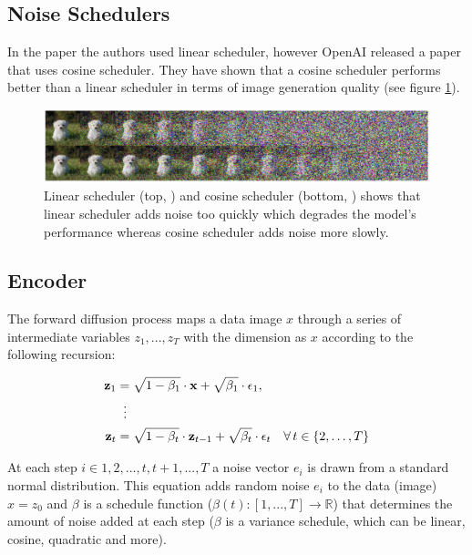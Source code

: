 \subsection{Noise Schedulers}

In the paper \cite{ddpm} the authors used linear scheduler, however OpenAI released a paper \cite{openai_improved_ddpm} that uses cosine scheduler. They have shown that a cosine scheduler performs better than a linear scheduler in terms of image generation quality (see figure \ref{fig:linear_cosine_scheduler}).

\begin{figure}
    \centering
    \includegraphics[width=1\textwidth]{images/diffusion_models/linear_cosine_scheduler.png}
    \caption{Linear scheduler (top, \cite{ddpm}) and cosine scheduler (bottom, \cite{openai_improved_ddpm}) shows that linear scheduler adds noise too quickly which degrades the model's performance whereas cosine scheduler adds noise more slowly.}
    \label{fig:linear_cosine_scheduler}
\end{figure}







\subsection{Encoder}

The forward diffusion process maps a data image $x$ through a series of intermediate variables $z_1, ..., z_T$ with the dimension as $x$ according to the following recursion:

\begin{equation}
    \begin{aligned}
    \mathbf{z}_1 &= \sqrt{1 - \beta_1} \cdot \mathbf{x} + \sqrt{\beta_1} \cdot \epsilon_1, \\
    &\;\;\vdots \notag \\
    \mathbf{z}_t &= \sqrt{1 - \beta_t} \cdot \mathbf{z}_{t-1} + \sqrt{\beta_t} \cdot \epsilon_t \quad \forall \, t \in \{2, \ldots, T\}
    \end{aligned}
\end{equation}

At each step $i \in {1, 2, ..., t, t+1, ..., T}$ a noise vector $e_i$ is drawn from a standard normal distribution. This equation adds random noise $e_i$ to the data (image) $x = z_0$ and $\beta$ is a schedule function ($\beta(t):[1, ..., T] \rightarrow \mathbb{R}$) that determines the amount of noise added at each step ($\beta$ is a variance schedule, which can be linear, cosine, quadratic and more). 


